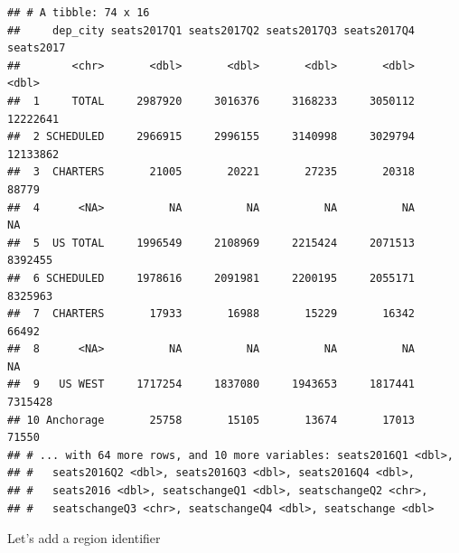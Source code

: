 \documentclass[]{book}
\newenvironment{Shaded}{\begin{snugshade}}{\end{snugshade}}
\newcommand{\KeywordTok}[1]{\textcolor[rgb]{0.13,0.29,0.53}{\textbf{{#1}}}}
\newcommand{\DecValTok}[1]{\textcolor[rgb]{0.00,0.00,0.81}{{#1}}}
\newcommand{\StringTok}[1]{\textcolor[rgb]{0.31,0.60,0.02}{{#1}}}
\newcommand{\OtherTok}[1]{\textcolor[rgb]{0.56,0.35,0.01}{{#1}}}
\newcommand{\NormalTok}[1]{{#1}}
\theoremstyle{definition}
\theoremstyle{definition}
\theoremstyle{remark}
\begin{document}
\begin{verbatim}
## # A tibble: 74 x 16
##     dep_city seats2017Q1 seats2017Q2 seats2017Q3 seats2017Q4 seats2017
##        <chr>       <dbl>       <dbl>       <dbl>       <dbl>     <dbl>
##  1     TOTAL     2987920     3016376     3168233     3050112  12222641
##  2 SCHEDULED     2966915     2996155     3140998     3029794  12133862
##  3  CHARTERS       21005       20221       27235       20318     88779
##  4      <NA>          NA          NA          NA          NA        NA
##  5  US TOTAL     1996549     2108969     2215424     2071513   8392455
##  6 SCHEDULED     1978616     2091981     2200195     2055171   8325963
##  7  CHARTERS       17933       16988       15229       16342     66492
##  8      <NA>          NA          NA          NA          NA        NA
##  9   US WEST     1717254     1837080     1943653     1817441   7315428
## 10 Anchorage       25758       15105       13674       17013     71550
## # ... with 64 more rows, and 10 more variables: seats2016Q1 <dbl>,
## #   seats2016Q2 <dbl>, seats2016Q3 <dbl>, seats2016Q4 <dbl>,
## #   seats2016 <dbl>, seatschangeQ1 <dbl>, seatschangeQ2 <chr>,
## #   seatschangeQ3 <chr>, seatschangeQ4 <dbl>, seatschange <dbl>
\end{verbatim}

Let's add a region identifier

\begin{Shaded}
\end{Shaded}
\end{document}
